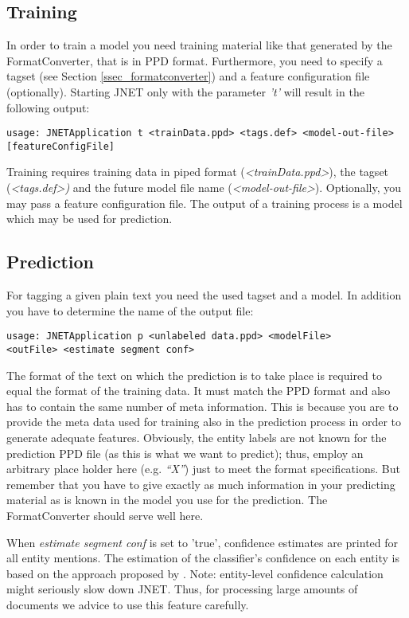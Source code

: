 \documentclass[11pt,a4paper,halfparskip]{scrartcl}
\begin{document}
\subsection{Training}
In order to train a model you need training material like that
generated by the FormatConverter, that is in PPD format.  Furthermore,
you need to specify a tagset (see Section \ref{ssec_formatconverter}) and a
feature
configuration file (optionally). Starting JNET only with the parameter
\textit{'t'} will result in the following output:
\begin{verbatim}
usage: JNETApplication t <trainData.ppd> <tags.def> <model-out-file>
[featureConfigFile]
\end{verbatim}
Training requires training data in piped format
(\textit{<trainData.ppd>}), the tagset (\textit{<tags.def>)} and the
future model file name (\textit{<model-out-file>}).  Optionally, you
may pass a feature configuration file. The output of a training
process is a model which may be used for prediction.


\subsection{Prediction}
\label{sec_prediction}
For tagging a given plain text you need the used tagset and a model.
In addition you have to determine the name of the output file:

\begin{verbatim}
usage: JNETApplication p <unlabeled data.ppd> <modelFile>
<outFile> <estimate segment conf>
\end{verbatim}

The format of the text on which the prediction is to take place is
required to equal the format of the training data. It must match the
PPD format and also has to contain the same number of meta
information. This is because you are to provide the meta data used for
training also in the prediction process in order to generate adequate
features. Obviously, the entity labels are not known for the
prediction PPD file (as this is what we want to predict); thus, employ
an arbitrary place holder here (e.g. \textit{``X''}) just to meet the
format specifications. But remember that you have to give exactly as
much information in your predicting material as is known in the model
you use for the prediction. The FormatConverter should serve well
here.

When \textit{estimate segment conf} is set to 'true', confidence
estimates are printed for all entity mentions. The estimation of the
classifier's confidence on each entity is based on the approach
proposed by \cite{Culotta2004}. Note: entity-level confidence
calculation might seriously slow down JNET. Thus, for processing large
amounts of documents we advice to use this feature carefully.
\end{document}
